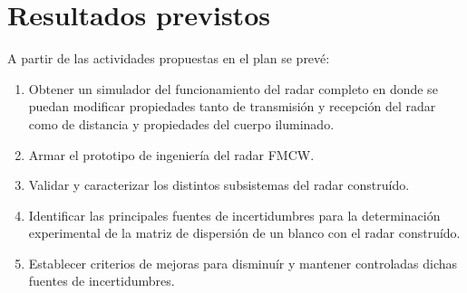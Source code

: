 \chapter{Resultados previstos} \label{ch:results}

A partir de las actividades propuestas en el plan se prevé:

\begin{enumerate}
    \item Obtener un simulador del funcionamiento del radar completo en donde se puedan modificar propiedades tanto de transmisión y recepción del radar como de distancia y propiedades del cuerpo iluminado.

    \item Armar el prototipo de ingeniería del radar FMCW.

    \item Validar y caracterizar los distintos subsistemas del radar construído. 

    \item Identificar las principales fuentes de incertidumbres para la determinación experimental de la matriz de dispersión de un blanco con el radar construído.

    \item Establecer criterios de mejoras para disminuír y mantener controladas dichas fuentes de incertidumbres.
\end{enumerate}
